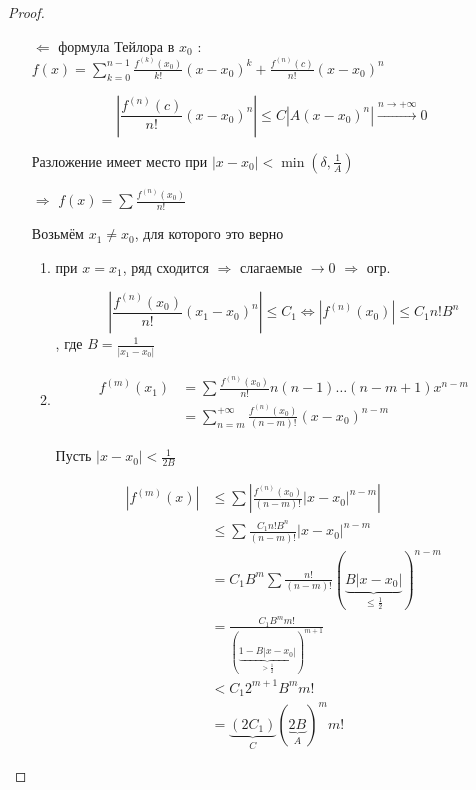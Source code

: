 \begin{proof}\itemfix
    \begin{enumerate}
        \item [ \( \Leftarrow \) ] формула Тейлора в \(x_0\) : \(f(x) = \sum\limits_{k = 0}^{n - 1} \frac{f^{(k)}(x_0)}{k!}(x - x_0)^k + \frac{f^{(n)}(c)}{n!} (x - x_0)^n\)

              \[\left|\frac{f^{(n)}(c)}{n!} (x - x_0)^n\right| \leq C|A(x - x_0)^n| \xrightarrow{n\to +\infty} 0\]

              Разложение имеет место при \(|x - x_0|<\min(\delta, \frac{1}{A})\)
        \item [ \( \Rightarrow \) ] \(f(x) = \sum \frac{f^{(n)}(x_0)}{n!}\)

              Возьмём \(x_1\neq x_0\), для которого это верно

              \begin{enumerate}
                  \item при \(x = x_1\), ряд сходится \(\Rightarrow\) слагаемые \(\to 0\) \(\Rightarrow\) огр.

                        \[\left|\frac{f^{(n)}(x_0)}{n!}(x_1 - x_0)^n \right| \leq C_1 \Leftrightarrow |f^{(n)}(x_0)| \leq C_1 n! B^n\]
                        , где \(B = \frac{1}{|x_1 - x_0|}\)
                  \item \begin{align*}
                            f^{(m)}(x_1) & = \sum \frac{f^{(n)}(x_0)}{n!}n(n - 1)\dots (n - m + 1)x^{n - m}          \\
                                         & = \sum_{n = m}^{ +\infty} \frac{f^{(n)}(x_0)}{(n - m)!} (x - x_0)^{n - m}
                        \end{align*}

                        Пусть \(|x - x_0|< \frac{1}{2B}\)

                        \begin{align}
                            |f^{(m)}(x)| & \leq \sum \left|\frac{f^{(n)}(x_0)}{(n - m)!} |x - x_0|^{n - m}\right|  \nonumber                 \\
                                         & \leq \sum \frac{C_1 n! B^n}{(n - m)!} |x - x_0|^{n - m}       \nonumber                           \\
                                         & = C_1 B^m \sum \frac{n!}{(n - m)!} (\underbrace{B|x - x_0|}_{\leq \frac{1}{2}})^{n - m} \nonumber \\
                                         & = \frac{C_1B^m m!}{(\underbrace{1 - B|x - x_0|}_{ > \frac{1}{2}})^{m + 1}}  \label{по сл2}        \\
                                         & < C_1 2^{m + 1} B^m m!           \nonumber                                                        \\
                                         & = \underbrace{(2C_1)}_{C}(\underbrace{2B}_{A})^m m!                        \nonumber
                        \end{align}


\end{enumerate}
\end{enumerate}
\end{proof}
